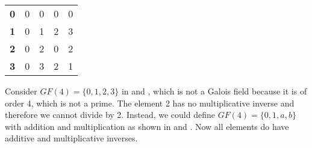 \documentclass[../main.tex]{subfiles}
\begin{document}
\begin{table}[htp]
\begin{center}
{\begin{minipage}[t]{0.4\textwidth}
\begin{center}
\begin{tabular}{c | c c c c}
                            \hline
                            \textbf{0}  & 0             & 0             & 0             & 0 \\
                            \textbf{1}  & 0             & 1             & 2             & 3 \\
                            \textbf{2}  & 0             & 2             & 0             & 2 \\
                            \textbf{3}  & 0             & 3             & 2             & 1 \\
                        \end{tabular}
                    \end{center}
                \end{minipage}
            }
        \end{center}
    \end{table}

    Consider ${GF(4)=\{0, 1, 2, 3\}}$ in  and , which is not a Galois field because it is of order 4, which is not a prime. The element 2 has no multiplicative inverse and therefore we cannot divide by 2. Instead, we could define ${GF(4)=\{0, 1, a, b\}}$ with addition and multiplication as shown in  and . Now all elements do have additive and multiplicative inverses.
\end{document}
